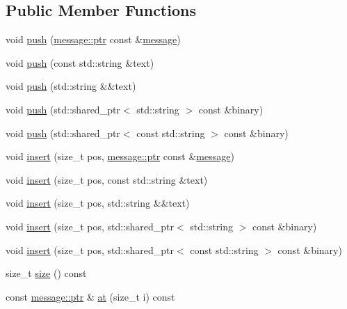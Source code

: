 \subsection*{Public Member Functions}
\begin{DoxyCompactItemize}
\item 
void \hyperlink{classsio_1_1array__message_a2bb6a7dc5a4bc481ec6638b027732e30}{push} (\hyperlink{classsio_1_1message_a6340b6fef57e4516eb17928b1885a615}{message\+::ptr} const \&\hyperlink{classsio_1_1message}{message})
\item 
void \hyperlink{classsio_1_1array__message_aa64e942b4bcdd9484638666bb45b6a1c}{push} (const std\+::string \&text)
\item 
void \hyperlink{classsio_1_1array__message_acf436faa854bfa7c3e323beea308a1a5}{push} (std\+::string \&\&text)
\item 
void \hyperlink{classsio_1_1array__message_a52d0cd50d5cd438ae21ddfbf2c62b72d}{push} (std\+::shared\+\_\+ptr$<$ std\+::string $>$ const \&binary)
\item 
void \hyperlink{classsio_1_1array__message_ab69517653493458d697647e1b5e0ae3f}{push} (std\+::shared\+\_\+ptr$<$ const std\+::string $>$ const \&binary)
\item 
void \hyperlink{classsio_1_1array__message_a5bf35c4605d386ca824c0948d991bed2}{insert} (size\+\_\+t pos, \hyperlink{classsio_1_1message_a6340b6fef57e4516eb17928b1885a615}{message\+::ptr} const \&\hyperlink{classsio_1_1message}{message})
\item 
void \hyperlink{classsio_1_1array__message_a6c42d79eee6b499ffd08769c741d5b7f}{insert} (size\+\_\+t pos, const std\+::string \&text)
\item 
void \hyperlink{classsio_1_1array__message_a0f865c08b9da48112d4b7c628f851220}{insert} (size\+\_\+t pos, std\+::string \&\&text)
\item 
void \hyperlink{classsio_1_1array__message_ac84632e5968cc80be47314a00c17af0c}{insert} (size\+\_\+t pos, std\+::shared\+\_\+ptr$<$ std\+::string $>$ const \&binary)
\item 
void \hyperlink{classsio_1_1array__message_ae154a195d738a3dec30a78865598ce89}{insert} (size\+\_\+t pos, std\+::shared\+\_\+ptr$<$ const std\+::string $>$ const \&binary)
\item 
size\+\_\+t \hyperlink{classsio_1_1array__message_ae854fb58883883ccc930de77285d7dae}{size} () const
\item 
const \hyperlink{classsio_1_1message_a6340b6fef57e4516eb17928b1885a615}{message\+::ptr} \& \hyperlink{classsio_1_1array__message_a97aba94eb40546998c86ed6901a8f331}{at} (size\+\_\+t i) const

\end{DoxyCompactItemize}
